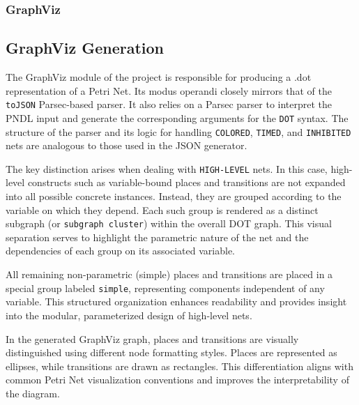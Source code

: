 \documentclass[12pt]{article}
\begin{document}
        \subsubsection{GraphViz}
        \subsection{GraphViz Generation}
            The GraphViz module of the project is responsible for producing a .dot representation of a Petri Net. Its modus operandi closely mirrors that of the \texttt{toJSON} Parsec-based parser. It also relies on a Parsec parser to interpret the PNDL input and generate the corresponding arguments for the \texttt{DOT} syntax. The structure of the parser and its logic for handling \texttt{COLORED}, \texttt{TIMED}, and \texttt{INHIBITED} nets are analogous to those used in the JSON generator.
            
            The key distinction arises when dealing with \texttt{HIGH-LEVEL} nets. In this case, high-level constructs such as variable-bound places and transitions are not expanded into all possible concrete instances. Instead, they are grouped according to the variable on which they depend. Each such group is rendered as a distinct subgraph (or \texttt{subgraph cluster}) within the overall DOT graph. This visual separation serves to highlight the parametric nature of the net and the dependencies of each group on its associated variable.
            
            All remaining non-parametric (simple) places and transitions are placed in a special group labeled \texttt{simple}, representing components independent of any variable. This structured organization enhances readability and provides insight into the modular, parameterized design of high-level nets.

            In the generated GraphViz graph, places and transitions are visually distinguished using different node formatting styles. Places are represented as ellipses, while transitions are drawn as rectangles. This differentiation aligns with common Petri Net visualization conventions and improves the interpretability of the diagram.
    
    
\end{document}

